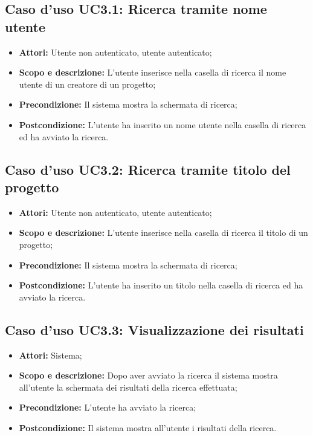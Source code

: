 \subsection{Caso d'uso UC3.1: Ricerca tramite nome utente}
\begin{itemize}
	\item \textbf{Attori:} Utente non autenticato, utente autenticato;
	\item \textbf{Scopo e descrizione:} L'utente inserisce nella casella di ricerca il nome utente di un creatore di un progetto;
	\item \textbf{Precondizione:} Il sistema mostra la schermata di ricerca;
	\item \textbf{Postcondizione:} L'utente ha inserito un nome utente nella casella di ricerca ed ha avviato la ricerca.
\end{itemize}

\subsection{Caso d'uso UC3.2: Ricerca tramite titolo del progetto}
\begin{itemize}
	\item \textbf{Attori:} Utente non autenticato, utente autenticato;
	\item \textbf{Scopo e descrizione:} L'utente inserisce nella casella di ricerca il titolo di un progetto;
	\item \textbf{Precondizione:} Il sistema mostra la schermata di ricerca;
	\item \textbf{Postcondizione:} L'utente ha inserito un titolo nella casella di ricerca ed ha avviato la ricerca.
\end{itemize}

\subsection{Caso d'uso UC3.3: Visualizzazione dei risultati}
\begin{itemize}
	\item \textbf{Attori:} Sistema;
	\item \textbf{Scopo e descrizione:} Dopo aver avviato la ricerca il sistema mostra all'utente la schermata dei risultati della ricerca effettuata;
	\item \textbf{Precondizione:} L'utente ha avviato la ricerca;
	\item \textbf{Postcondizione:} Il sistema mostra all'utente i risultati della ricerca.
\end{itemize}